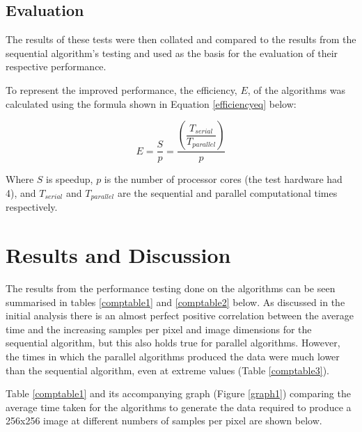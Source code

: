 \documentclass[journal,transmag]{IEEEtran}
\begin{document}
	\subsection{Evaluation}
	The results of these tests were then collated and compared to the results from the sequential algorithm's testing and used as the basis for the evaluation of	their respective performance.
	
	To represent the improved performance, the efficiency, $E$, of the algorithms was calculated using the formula shown in Equation \ref{efficiencyeq} below:
	
	\begin{equation} \label{efficiencyeq} 
	E = \dfrac{S}{p} = \dfrac{(\dfrac{T_{serial}}{T_{parallel}})}{p}
	\end{equation}
	
	Where $S$ is speedup, $p$ is the number of processor cores (the test hardware had 4), and $T_{serial}$ and $T_{parallel}$ are the sequential and parallel computational times respectively.
	
	\section{Results and Discussion}
	The results from the performance testing done on the algorithms can be seen summarised in tables \ref{comptable1} and \ref{comptable2} below. As discussed in the initial analysis there is an almost perfect positive correlation between the average time and the increasing samples per pixel and image dimensions for the sequential algorithm, but this also holds true for parallel algorithms. However, the times in which the parallel algorithms produced the data were much lower than the sequential algorithm, even at extreme values (Table \ref{comptable3}).
	
	Table \ref{comptable1} and its accompanying graph (Figure \ref{graph1}) comparing the average time taken for the algorithms to generate the data required to produce a 256x256 image at different numbers of samples per pixel are shown below.
	
\end{document}
